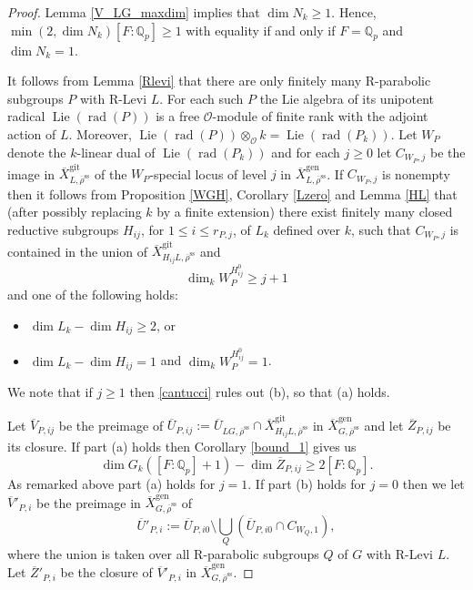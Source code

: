 \documentclass[10pt,a4paper]{amsart}
\DeclareMathOperator{\Lie}{Lie}
\newcommand{\OO}{\mathcal O}
\newcommand{\Qp}{\mathbb {Q}_p}
\newcommand{\Ubar}{\overline{U}}
\newcommand{\Vbar}{\overline{{V}}}
\newcommand{\Xbar}{\overline{X}}
\newcommand{\Zbar}{\overline{Z}}
\newcommand{\gen}{\mathrm{gen}}
\newcommand{\gps}{\mathrm{git}}
\DeclareMathOperator{\rad}{rad}
\newcommand{\rhobar}{\overline{\rho}}
\newcommand{\rhobarss}{\rhobar^{\mathrm{ss}}}
\begin{document}
\begin{proof} Lemma \ref{V_LG_maxdim} implies that $\dim N_k\ge 1$. Hence, $\min(2, \dim N_k)[F:\Qp]\ge 1$ with 
equality if and only if  $F=\Qp$ and $\dim N_k=1$.

It follows from Lemma \ref{Rlevi} that there are only finitely many R-parabolic subgroups 
$P$ with R-Levi $L$. For each such $P$ the Lie algebra of its unipotent radical $\Lie(\rad(P))$
is a free $\OO$-module of finite rank with the adjoint action of  $L$. Moreover, 
$\Lie(\rad(P))\otimes_{\OO} k = \Lie(\rad(P_k))$. Let $W_P$ denote the 
$k$-linear dual of $\Lie(\rad(P_k))$ and for each $j\ge 0$ let $C_{W_P, j}$ be the image in $\Xbar^{\gps}_{L, \rhobarss}$ of the 
$W_P$-special locus of level $j$ in $\Xbar^{\gen}_{L, \rhobarss}$. If $C_{W_P, j}$ is nonempty then it follows from Proposition \ref{WGH}, Corollary \ref{Lzero} and Lemma \ref{HL}
that (after possibly replacing $k$ by a finite extension) there exist finitely many closed reductive subgroups $H_{ij}$, for $1\le i \le r_{P,j}$, of $L_k$ defined over $k$, 
such that $C_{W_P, j}$ is contained in the union of $\Xbar^{\gps}_{H_{ij} L, \rhobarss}$ and
\begin{equation}\label{cantucci}
\dim_k W_P^{H^0_{ij}}\ge j+1
\end{equation} 
and one of the 
following holds:
\begin{itemize} 
\item[(a)] $\dim L_k -\dim H_{ij} \ge 2$, or
\item[(b)] $\dim L_k -\dim H_{ij}=1$ and $\dim_k W_P^{H^0_{ij}}=1$. 
\end{itemize} 
We note that if $j\ge 1$ then \eqref{cantucci} rules out (b), so that (a) holds. 

Let $\Vbar_{P,ij}$ be the preimage of $\Ubar_{P,ij}:=\Ubar_{LG, \rhobarss}\cap \Xbar^{\gps}_{H_{ij} L, \rhobarss}$  
in $\Xbar^{\gen}_{G, \rhobarss}$ and let $\Zbar_{P, ij}$ be its closure. If part  (a) holds then 
Corollary \ref{bound_1} gives us
\begin{equation}\label{eq_ij}
 \dim G_k ([F:\Qp]+1) - \dim \Zbar_{P,ij}\ge 2[F:\Qp].
\end{equation}
As remarked above part (a) holds for $j=1$. If part (b) holds for $j=0$ then 
we let $\Vbar'_{P,i}$ be the preimage in 
$\Xbar^{\gen}_{G, \rhobarss}$ of 
$$\Ubar'_{P,i}:= \Ubar_{P,i0} \setminus \bigcup_{Q} (\Ubar_{P,i0} \cap C_{W_Q, 1}),$$ 
where the union is taken over all R-parabolic subgroups $Q$ of $G$ with R-Levi $L$.
Let $\Zbar'_{P,i}$ be the closure of $\Vbar'_{P,i}$ in  $\Xbar^{\gen}_{G, \rhobarss}$.  


\end{proof}
\end{document}
